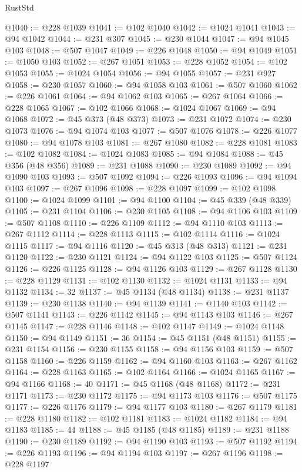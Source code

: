 \begin{lexlean}{RustStd}
\begin{coremodule}
@1040 := @228 @1039
@1041 := @102 @1040
@1042 := @1024 @1041
@1043 := @94 @1042
@1044 := @231 @307
@1045 := @230 @1044
@1047 := @94 @1045 @103
@1048 := @507 @1047
@1049 := @226 @1048
@1050 := @94 @1049
@1051 := @1050 @103
@1052 := @267 @1051
@1053 := @228 @1052
@1054 := @102 @1053
@1055 := @1024 @1054
@1056 := @94 @1055
@1057 := @231 @927
@1058 := @230 @1057
@1060 := @94 @1058 @103
@1061 := @507 @1060
@1062 := @226 @1061
@1064 := @94 @1062 @103
@1065 := @267 @1064
@1066 := @228 @1065
@1067 := @102 @1066
@1068 := @1024 @1067
@1069 := @94 @1068
@1072 := @45 @373 (@48 @373)
@1073 := @231 @1072
@1074 := @230 @1073
@1076 := @94 @1074 @103
@1077 := @507 @1076
@1078 := @226 @1077
@1080 := @94 @1078 @103
@1081 := @267 @1080
@1082 := @228 @1081
@1083 := @102 @1082
@1084 := @1024 @1083
@1085 := @94 @1084
@1088 := @45 @356 (@48 @356)
@1089 := @231 @1088
@1090 := @230 @1089
@1092 := @94 @1090 @103
@1093 := @507 @1092
@1094 := @226 @1093
@1096 := @94 @1094 @103
@1097 := @267 @1096
@1098 := @228 @1097
@1099 := @102 @1098
@1100 := @1024 @1099
@1101 := @94 @1100
@1104 := @45 @339 (@48 @339)
@1105 := @231 @1104
@1106 := @230 @1105
@1108 := @94 @1106 @103
@1109 := @507 @1108
@1110 := @226 @1109
@1112 := @94 @1110 @103
@1113 := @267 @1112
@1114 := @228 @1113
@1115 := @102 @1114
@1116 := @1024 @1115
@1117 := @94 @1116
@1120 := @45 @313 (@48 @313)
@1121 := @231 @1120
@1122 := @230 @1121
@1124 := @94 @1122 @103
@1125 := @507 @1124
@1126 := @226 @1125
@1128 := @94 @1126 @103
@1129 := @267 @1128
@1130 := @228 @1129
@1131 := @102 @1130
@1132 := @1024 @1131
@1133 := @94 @1132
@1134 := 32
@1137 := @45 @1134 (@48 @1134)
@1138 := @231 @1137
@1139 := @230 @1138
@1140 := @94 @1139
@1141 := @1140 @103
@1142 := @507 @1141
@1143 := @226 @1142
@1145 := @94 @1143 @103
@1146 := @267 @1145
@1147 := @228 @1146
@1148 := @102 @1147
@1149 := @1024 @1148
@1150 := @94 @1149
@1151 := 36
@1154 := @45 @1151 (@48 @1151)
@1155 := @231 @1154
@1156 := @230 @1155
@1158 := @94 @1156 @103
@1159 := @507 @1158
@1160 := @226 @1159
@1162 := @94 @1160 @103
@1163 := @267 @1162
@1164 := @228 @1163
@1165 := @102 @1164
@1166 := @1024 @1165
@1167 := @94 @1166
@1168 := 40
@1171 := @45 @1168 (@48 @1168)
@1172 := @231 @1171
@1173 := @230 @1172
@1175 := @94 @1173 @103
@1176 := @507 @1175
@1177 := @226 @1176
@1179 := @94 @1177 @103
@1180 := @267 @1179
@1181 := @228 @1180
@1182 := @102 @1181
@1183 := @1024 @1182
@1184 := @94 @1183
@1185 := 44
@1188 := @45 @1185 (@48 @1185)
@1189 := @231 @1188
@1190 := @230 @1189
@1192 := @94 @1190 @103
@1193 := @507 @1192
@1194 := @226 @1193
@1196 := @94 @1194 @103
@1197 := @267 @1196
@1198 := @228 @1197

\end{coremodule}
\end{lexlean}
